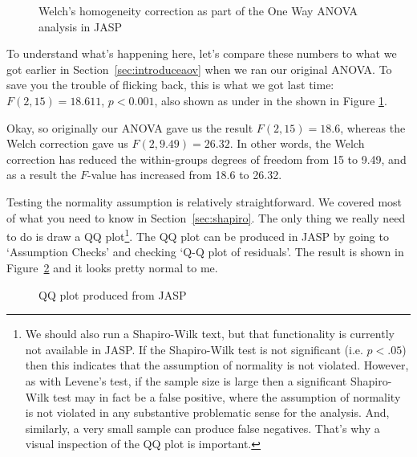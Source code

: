 \begin{figure}[htb]
\begin{center}
\caption{Welch's homogeneity correction as part of the One Way ANOVA analysis in JASP }
\HR
\label{fig:anova4a}
\end{center}
\end{figure}

\noindent
To understand what's happening here, let's compare these numbers to what we got earlier in Section~\ref{sec:introduceaov} when we ran our original ANOVA. To save you the trouble of flicking back, this is what we got last time: $F(2,15) = 18.611$, $p<0.001$, also shown as  under  in the  shown in Figure \ref{fig:anova4a}. 

Okay, so originally our ANOVA gave us the result $F(2,15) = 18.6$, whereas the Welch correction gave us $F(2,9.49) = 26.32$. In other words, the Welch correction has reduced the within-groups degrees of freedom from 15 to 9.49, and as a result the $F$-value has increased from 18.6 to 26.32. 


Testing the normality assumption is relatively straightforward. We covered most of what you need to know in Section~\ref{sec:shapiro}. The only thing we really need to do is draw a QQ plot\footnote{We should also run a Shapiro-Wilk text, but that functionality is currently not available in JASP. If the Shapiro-Wilk test is not significant (i.e. $p<.05$) then this indicates that the assumption of normality is not violated. However, as with Levene's test, if the sample size is large then a significant  Shapiro-Wilk test may in fact be a false positive, where the assumption of normality is not violated in any substantive problematic sense for the analysis. And, similarly, a very small sample can produce false negatives. That's why a visual inspection of the QQ plot is important.}. The QQ plot can be produced in JASP by going to `Assumption Checks' and checking `Q-Q plot of residuals'.  The result is shown in Figure~\ref{fig:anova5} and it looks pretty normal to me.  

\begin{figure}[p]
\begin{center}
\caption{QQ plot produced from JASP}
\HR
\label{fig:anova5}
\end{center}
\end{figure}



